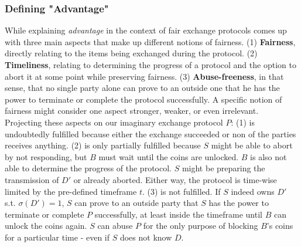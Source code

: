 \documentclass{cacthesis}
\begin{document}
        \subsubsection{Defining "Advantage"}
        While explaining \textit{advantage} in the context of fair exchange protocols \cite{10.1007/3-540-36552-4_31} comes up with three main aspects that make up different notions of fairness. (1) \textbf{Fairness}, directly relating to the items being exchanged during the protocol. (2) \textbf{Timeliness}, relating to determining the progress of a protocol and the option to abort it at some point while preserving fairness. (3) \textbf{Abuse-freeness}, in that sense, that no single party alone can prove to an outside one that he has the power to terminate or complete the protocol successfully. A specific notion of fairness might consider one aspect stronger, weaker, or even irrelevant. \\
        Projecting these aspects on our imaginary exchange protocol $P$: (1) is undoubtedly fulfilled because either the exchange succeeded or non of the parties receives anything. (2) is only partially fulfilled because $S$ might be able to abort by not responding, but $B$ must wait until the coins are unlocked. $B$ is also not able to determine the progress of the protocol. $S$ might be preparing the transmission of $D'$ or already aborted. Either way, the protocol is time-wise limited by the pre-defined timeframe $t$. (3) is not fulfilled. If $S$ indeed owns $D'$ s.t. $\sigma\left( D'\right) =1$, $S$ can prove to an outside party that $S$ has the power to terminate or complete $P$ successfully, at least inside the timeframe until $B$ can unlock the coins again. $S$ can abuse $P$ for the only purpose of blocking $B$'s coins for a particular time - even if $S$ does not know $D$.
        
\end{document}
